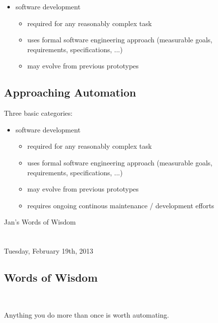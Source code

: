 \documentclass[xga]{xdvislides}
\begin{document}
\begin{itemize}
	\item software development
		\begin{itemize}
			\item required for any reasonably complex task
			\item uses formal software engineering approach (measurable goals,
				requirements, specifications, ...)
			\item may evolve from previous prototypes
		\end{itemize}
\end{itemize}


\subsection{Approaching Automation}
Three basic categories:
\\

\begin{itemize}
	\item software development
		\begin{itemize}
			\item required for any reasonably complex task
			\item uses formal software engineering approach (measurable goals,
				requirements, specifications, ...)
			\item may evolve from previous prototypes
			\item requires ongoing continous maintenance / development efforts
		\end{itemize}
\end{itemize}


\newpage
\vspace*{\fill}
\begin{center}
	\Hugesize
		Jan's Words of Wisdom \\ [1em]
	\hspace*{5mm}
	\blueline\\
	\hspace*{5mm}\\
		Tuesday, February 19th, 2013
\end{center}
\vspace*{\fill}

\subsection{Words of Wisdom}
\\

\newcommand{\gargantuan}{\fontsize{60}{65}\selectfont}
\gargantuan
\begin{center}
Anything you do more than once is worth automating.
\end{center}
\Normalsize
\end{document}
